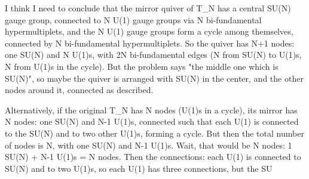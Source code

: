I think I need to conclude that the mirror quiver of T_N has a central SU(N) gauge group, connected to N U(1) gauge groups via N bi-fundamental hypermultiplets, and the N U(1) gauge groups form a cycle among themselves, connected by N bi-fundamental hypermultiplets. So the quiver has N+1 nodes: one SU(N) and N U(1)s, with 2N bi-fundamental edges (N from SU(N) to U(1)s, N from U(1)s in the cycle). But the problem says "the middle one which is SU(N)", so maybe the quiver is arranged with SU(N) in the center, and the other nodes around it, connected as described. 

Alternatively, if the original T_N has N nodes (U(1)s in a cycle), its mirror has N nodes: one SU(N) and N-1 U(1)s, connected such that each U(1) is connected to the SU(N) and to two other U(1)s, forming a cycle. But then the total number of nodes is N, with one SU(N) and N-1 U(1)s. Wait, that would be N nodes: 1 SU(N) + N-1 U(1)s = N nodes. Then the connections: each U(1) is connected to SU(N) and to two U(1)s, so each U(1) has three connections, but the SU